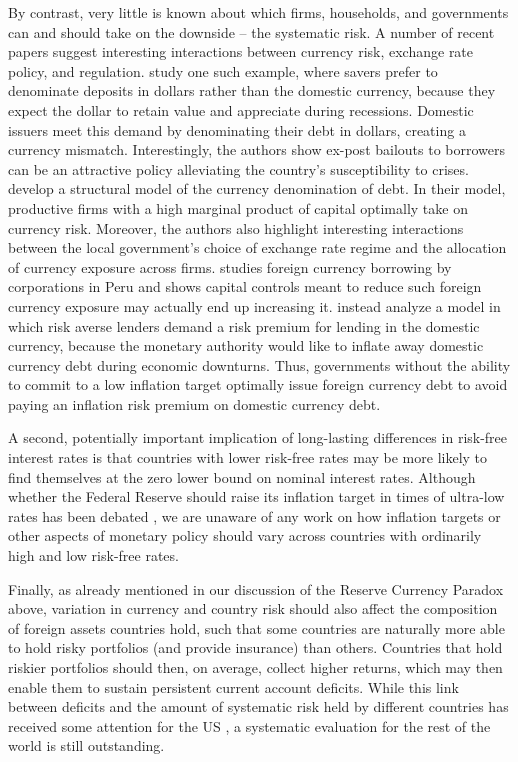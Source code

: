 \documentclass[11pt]{article}
\begin{document}
By contrast, very little is known about which firms, households, and governments can and should take on the downside -- the systematic risk. A number of recent papers suggest interesting interactions between currency risk, exchange rate policy, and regulation. \citet{Bocola2019} study one such example, where savers prefer to denominate deposits in dollars rather than the domestic currency, because they expect the dollar to retain value and appreciate during recessions. Domestic issuers meet this demand by denominating their debt in dollars, creating a currency mismatch. Interestingly, the authors show ex-post bailouts to borrowers can be an attractive policy alleviating the country's susceptibility to crises. \citet{SalomaoVarela2019} develop a structural model of the currency denomination of debt. In their model, productive firms with a high marginal product of capital optimally take on currency risk. Moreover, the authors also highlight interesting interactions between the local government's choice of exchange rate regime and the allocation of currency exposure across firms. \cite{keller2019capital} studies foreign currency borrowing by corporations in Peru and shows capital controls meant to reduce such foreign currency exposure may actually end up increasing it. \citet{du2020sovereign} instead analyze a model in which risk averse lenders demand a risk premium for lending in the domestic currency, because the monetary authority would like to inflate away domestic currency debt during economic downturns. Thus, governments without the ability to commit to a low inflation target optimally issue foreign currency debt to avoid paying an inflation risk premium on domestic currency debt. 

A second, potentially important implication of long-lasting differences in risk-free interest rates is that countries with lower risk-free rates may be more likely to find themselves at the zero lower bound on nominal interest rates. Although whether the Federal Reserve should raise its inflation target in times of ultra-low rates has been debated \citep{Coibion2012, Holston2017, mertens2018expect}, we are unaware of any work on how inflation targets or other aspects of monetary policy should vary across countries with ordinarily high and low risk-free rates. 

Finally, as already mentioned in our discussion of the Reserve Currency Paradox above, variation in currency and country risk should also affect the composition of foreign assets countries hold, such that some countries are naturally more able to hold risky portfolios (and provide insurance) than others. Countries that hold riskier portfolios should then, on average, collect higher returns, which may then enable them to sustain persistent current account deficits. While this link between deficits and the amount of systematic risk held by different countries has received some attention for the US \citep{Caballeroetal2008,GourinchasRey2007,GourinchasGovillotRey2017}, a systematic evaluation for the rest of the world is still outstanding.
\end{document}
